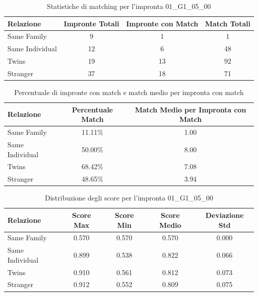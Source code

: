\begin{table}[htbp]
\centering
\caption{Statistiche di matching per l'impronta 01\_G1\_05\_00}
\label{tab:results_01_G1_05_00}
\begin{tabular}{|l|c|c|c|}
\hline
\textbf{Relazione} & \textbf{Impronte Totali} & \textbf{Impronte con Match} & \textbf{Match Totali} \\
\hline
Same Family & 9 & 1 & 1 \\
\hline
Same Individual & 12 & 6 & 48 \\
\hline
Twins & 19 & 13 & 92 \\
\hline
Stranger & 37 & 18 & 71 \\
\hline
\end{tabular}
\end{table}


\begin{table}[htbp]
\centering
\caption{Percentuale di impronte con match e match medio per impronta con match}
\label{tab:match_percentage_01_G1_05_00}
\begin{tabular}{|l|c|c|}
\hline
\textbf{Relazione} & \textbf{Percentuale Match} & \textbf{Match Medio per Impronta con Match} \\
\hline
Same Family & 11.11\% & 1.00 \\
\hline
Same Individual & 50.00\% & 8.00 \\
\hline
Twins & 68.42\% & 7.08 \\
\hline
Stranger & 48.65\% & 3.94 \\
\hline
\end{tabular}
\end{table}


\begin{table}[htbp]
\centering
\caption{Distribuzione degli score per l'impronta 01\_G1\_05\_00}
\label{tab:scores_01_G1_05_00}
\begin{tabular}{|l|c|c|c|c|}
\hline
\textbf{Relazione} & \textbf{Score Max} & \textbf{Score Min} & \textbf{Score Medio} & \textbf{Deviazione Std} \\
\hline
Same Family & 0.570 & 0.570 & 0.570 & 0.000 \\
\hline
Same Individual & 0.899 & 0.538 & 0.822 & 0.066 \\
\hline
Twins & 0.910 & 0.561 & 0.812 & 0.073 \\
\hline
Stranger & 0.912 & 0.552 & 0.809 & 0.075 \\
\hline
\end{tabular}
\end{table}

